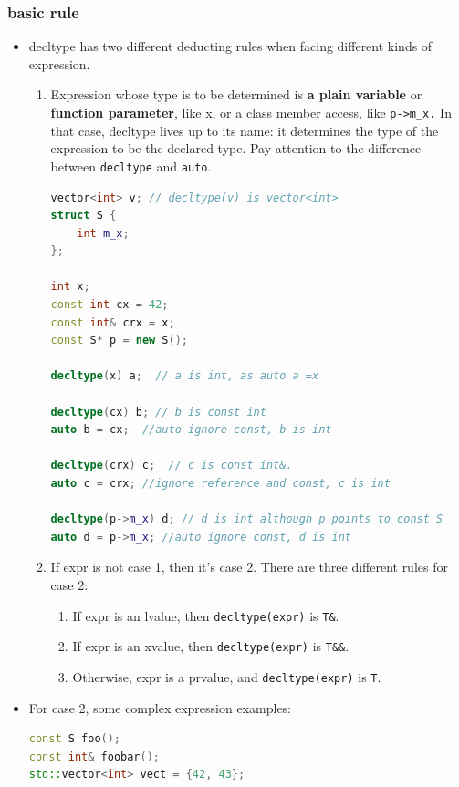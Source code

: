 \documentclass[a4paper,11pt,twoside]{book}
\begin{document}
\subsubsection{basic rule}
\begin{itemize}
	\item decltype has two different deducting rules when facing different kinds of expression.
	
	\begin{enumerate}
		\item Expression whose type is to be determined is \textbf{a plain variable} or \textbf{function parameter}, like x, or a class member access, like \texttt{p->m\_x.} In that case, decltype lives up to its name: it determines the type of the expression to be the declared type.  Pay attention to the difference between \texttt{decltype} and \texttt{auto}.
\begin{lstlisting}[frame=single, language=c++]
vector<int> v; // decltype(v) is vector<int>
struct S {
	int m_x;
};

int x;
const int cx = 42;
const int& crx = x;
const S* p = new S();

decltype(x) a;  // a is int, as auto a =x

decltype(cx) b; // b is const int
auto b = cx;  //auto ignore const, b is int

decltype(crx) c;  // c is const int&.
auto c = crx; //ignore reference and const, c is int

decltype(p->m_x) d; // d is int although p points to const S
auto d = p->m_x; //auto ignore const, d is int
\end{lstlisting}
		
		\item If expr is not case 1, then it's case 2. There are three different rules for case 2:
		\begin{enumerate}
			\item If expr is an lvalue, then \texttt{decltype(expr)} is \texttt{T\&}. 
			\item If expr is an xvalue, then \texttt{decltype(expr)} is \texttt{T\&\&}. 
			\item Otherwise, expr is a prvalue, and \texttt{decltype(expr)} is \texttt{T}.
		\end{enumerate}
	\end{enumerate}


\item For case 2, some complex expression examples:
\begin{lstlisting}[frame=single, language=c++]
const S foo();
const int& foobar();
std::vector<int> vect = {42, 43};


\end{lstlisting}
\end{itemize}
\end{document}
